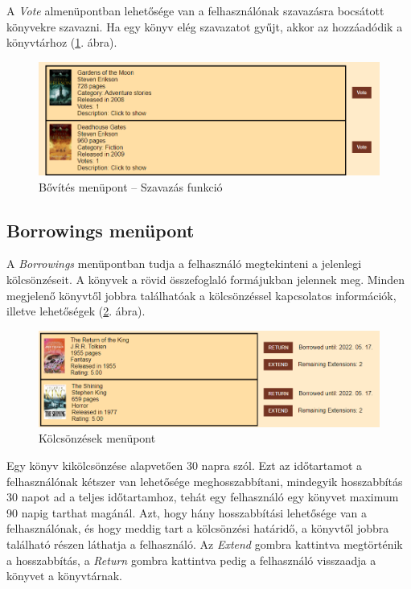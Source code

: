 A \textit{Vote} almenüpontban lehetősége van a felhasználónak szavazásra bocsátott könyvekre szavazni. Ha egy könyv elég szavazatot gyűjt, akkor az hozzáadódik a könyvtárhoz (\ref{fig:expand}. ábra).

\begin{figure}[h]
    \centering
    \includegraphics[scale=0.5]{images/application/expand.png}
    \caption{Bővítés menüpont -- Szavazás funkció}
    \label{fig:expand}
\end{figure}

\subsection{Borrowings menüpont}

A \textit{Borrowings} menüpontban tudja a felhasználó megtekinteni a jelenlegi kölcsönzéseit. A könyvek a rövid összefoglaló formájukban jelennek meg. Minden megjelenő könyvtől jobbra találhatóak a kölcsönzéssel kapcsolatos információk, illetve lehetőségek (\ref{fig:borrowings}. ábra). 

\begin{figure}[h]
    \centering
    \includegraphics[scale=0.6]{images/application/borrowings.png}
    \caption{Kölcsönzések menüpont}
    \label{fig:borrowings}
\end{figure}

Egy könyv kikölcsönzése alapvetően 30 napra szól. Ezt az időtartamot a felhasználónak kétszer van lehetősége meghosszabbítani, mindegyik hosszabbítás 30 napot ad a teljes időtartamhoz, tehát egy felhasználó egy könyvet maximum 90 napig tarthat magánál. Azt, hogy hány hosszabbítási lehetősége van a felhasználónak, és hogy meddig tart a kölcsönzési határidő, a könyvtől jobbra található részen láthatja a felhasználó. Az \textit{Extend} gombra kattintva megtörténik a hosszabbítás, a \textit{Return} gombra kattintva pedig a felhasználó visszaadja a könyvet a könyvtárnak. 

